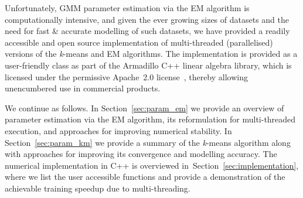 Unfortunately, GMM parameter estimation via the EM algorithm is computationally
intensive, and %
given the ever growing sizes of datasets and the need for fast \& accurate modelling of such datasets,
we have provided a readily accessible and open source implementation of multi-threaded (parallelised) versions 
of the {\it k}-means and EM algorithms.
The implementation is provided as a user-friendly class as part of the Armadillo C++ linear algebra library, which is
licensed under the permissive Apache~2.0 license~\cite{Laurent_2008},
thereby allowing unencumbered use in commercial products.

We continue as follows.
In Section~\ref{sec:param_em} we provide an overview of parameter estimation via the EM algorithm,
its reformulation for multi-threaded execution,
and approaches for improving numerical stability.
In Section~\ref{sec:param_km} we provide a summary of the {\it k}-means algorithm
along with approaches for improving its convergence and modelling accuracy.
The numerical implementation in C++ is overviewed in~Section~\ref{sec:implementation},
where we list the user accessible functions
and provide a demonstration of the achievable training speedup due to multi-threading.




